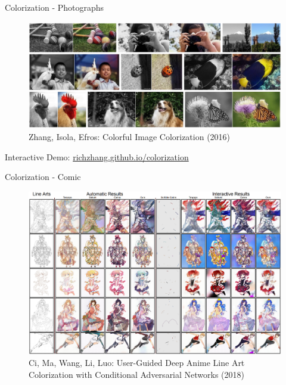 \documentclass{beamer}
\begin{document}
\begin{frame}{Colorization - Photographs}
\begin{figure}[ht]
    \centering
    \includegraphics[width=0.8\paperwidth, height=0.7\paperheight, keepaspectratio]{graphics/colorful-image-colorization.png}
    \captionsetup{labelformat=empty}
    \caption{Zhang, Isola, Efros: Colorful Image Colorization (2016)}
\end{figure}

Interactive Demo: \href{http://richzhang.github.io/colorization/}{richzhang.github.io/colorization}
\end{frame}


\begin{frame}{Colorization - Comic}
\begin{figure}[ht]
    \centering
    \includegraphics[width=0.8\paperwidth, height=0.7\paperheight, keepaspectratio]{graphics/comic-colorization.png}
    \captionsetup{labelformat=empty}
    \caption{Ci, Ma, Wang, Li, Luo: User-Guided Deep Anime Line Art Colorization with Conditional Adversarial Networks (2018)}
\end{figure}
\end{frame}
\end{document}
